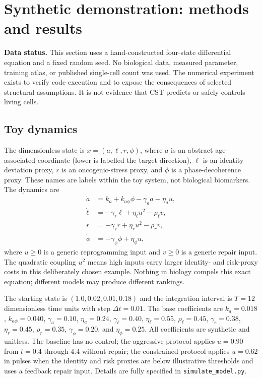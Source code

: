 \documentclass[11pt,a4paper]{article}
\theoremstyle{definition}
\theoremstyle{remark}
\begin{document}
\section{Synthetic demonstration: methods and results}
\textbf{Data status.} This section uses a hand-constructed four-state differential equation and a fixed random seed. No biological data, measured parameter, training atlas, or published single-cell count was used. The numerical experiment exists to verify code execution and to expose the consequences of selected structural assumptions. It is not evidence that CST predicts or safely controls living cells.

\subsection{Toy dynamics}
The dimensionless state is $x=(a,\ell,r,\phi)$, where $a$ is an abstract age-associated coordinate (lower is labelled the target direction), $\ell$ is an identity-deviation proxy, $r$ is an oncogenic-stress proxy, and $\phi$ is a phase-decoherence proxy. These names are labels within the toy system, not biological biomarkers. The dynamics are
\begin{align}
\dot a &= k_a+k_{a\phi}\phi-\gamma_a a-\eta_a u,\\
\dot\ell&=-\gamma_\ell\ell+\eta_\ell u^2-\rho_\ell v,\\
\dot r&=-\gamma_r r+\eta_r u^2-\rho_r v,\\
\dot\phi&=-\gamma_\phi\phi+\eta_\phi u,
\label{eq:toy}
\end{align}
where $u\geq0$ is a generic reprogramming input and $v\geq0$ is a generic repair input. The quadratic coupling $u^2$ means high inputs carry larger identity- and risk-proxy costs in this deliberately chosen example. Nothing in biology compels this exact equation; different models may produce different rankings.

The starting state is $(1.0,0.02,0.01,0.18)$ and the integration interval is $T=12$ dimensionless time units with step $\Delta t=0.01$. The base coefficients are $k_a=0.018$, $k_{a\phi}=0.040$, $\gamma_a=0.10$, $\eta_a=0.24$, $\gamma_\ell=0.40$, $\eta_\ell=0.55$, $\rho_\ell=0.45$, $\gamma_r=0.38$, $\eta_r=0.45$, $\rho_r=0.35$, $\gamma_\phi=0.20$, and $\eta_\phi=0.25$. All coefficients are synthetic and unitless. The baseline has no control; the aggressive protocol applies $u=0.90$ from $t=0.4$ through $4.4$ without repair; the constrained protocol applies $u=0.62$ in pulses when the identity and risk proxies are below illustrative thresholds and uses a feedback repair input. Details are fully specified in \texttt{simulate\_model.py}.
\end{document}
